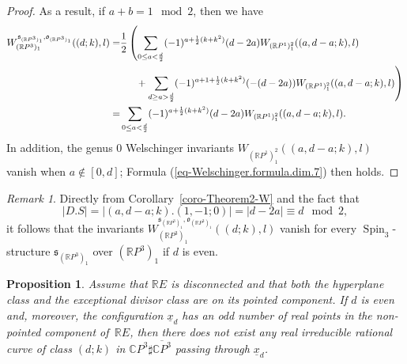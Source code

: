 \documentclass[11pt]{amsart}
\numberwithin{equation}{section}
\theoremstyle{definition}
\theoremstyle{plain}
\newtheorem{proposition}[definition]{Proposition}
\theoremstyle{remark}
\newtheorem{remark}[definition]{Remark}
\newcommand{\R}{\mathbb{R}}
\newcommand{\C}{\mathbb{C}}
\DeclareMathOperator{\Spin}{Spin}
\begin{document}
\begin{proof}
As a result, if $a+b = 1 \mod 2$, then we have 
\begin{align*}
    W_{(\R P^3)_1}^{\mathfrak{s}_{(\R P^3)_1},\mathfrak{o}_{(\R P^3)_1}}((d;k),l)
    = & \frac{1}{2}\left(\sum_{0\leq a<\frac{d}{2}}(-1)^{a+\frac{1}{2}(k+k^2)} (d-2a) W_{(\R P^1)^2_1} ((a,d-a;k),l)\right.\\
    & \left.\hphantom{\frac{1}{2}\Big(}+ \sum_{d\geq a>\frac{d}{2}}(-1)^{a+1+\frac{1}{2}(k+k^2)} (-(d-2a)) W_{(\R P^1)^2_1} ((a,d-a;k),l) \right)\\
    = & \sum_{0\leq a<\frac{d}{2}}(-1)^{a+\frac{1}{2}(k+k^2)} (d-2a) W_{(\R P^1)^2_1} ((a,d-a;k),l).
\end{align*}
In addition, the genus $0$ Welschinger invariants $ W_{(\R P^1)^2_1} ((a,d-a;k),l)$ vanish when $a \notin [0,d]$; Formula (\ref{eq-Welschinger.formula.dim.7}) then holds.
\end{proof}

\begin{remark}  Directly from Corollary~\ref{coro-Theorem2-W} and the fact that $$|D.S|=|(a,d-a;k).(1,-1;0)|=| d-2a|\equiv d \mod 2,$$
it follows that the invariants $W_{(\R P^3)_1}^{\mathfrak{s}_{(\R P^3)_1},\mathfrak{o}_{(\R P^3)_1}}((d;k),l)$ vanish  for every $\Spin_3$-structure $\mathfrak{s}_{(\R P^3)_1}$ over $(\R P^3)_1$ if $d$ is even.
\end{remark}

\begin{proposition} \label{prop-application.deg7}
 Assume that $\R E$ is disconnected and that both the hyperplane class and the exceptional divisor class are on its pointed component. If $d$ is even and, moreover, the configuration $\underline{x}_d$ has an odd number of real points in the non-pointed component of\, $\R E$, then there does not exist any real irreducible rational curve of class $(d;k)$  in  $\C P^3 \sharp \overline{\C P^3}$ passing through $\underline{x}_d$. 
\end{proposition}
\end{document}
